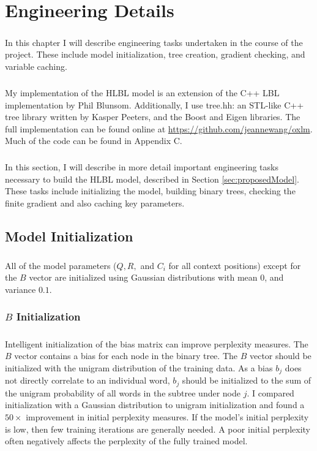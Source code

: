
\chapter{Engineering Details}
\paragraph{}
In this chapter I will describe engineering tasks undertaken in the course of the project. These include model initialization, tree creation, gradient checking, and variable caching.

\paragraph{}
My implementation of the HLBL model is an extension of the C++ LBL implementation by Phil Blunsom. Additionally, I use tree.hh: an STL-like C++ tree library written by Kasper Peeters, and the Boost \cite{BoostSite} and Eigen \cite{eigenweb} libraries. The full implementation can be found online at \url{https://github.com/jeannewang/oxlm}. Much of the code can be found in Appendix C.
\paragraph{}
In this section, I will describe in more detail important engineering tasks necessary to build the HLBL model, described in Section \ref{sec:proposedModel}. These tasks include initializing the model, building binary trees, checking the finite gradient and also caching key parameters.

\section{Model Initialization}
\paragraph{}
All of the model parameters ($Q,R,$ and $C_i$ for all context positions) except for the $B$ vector are initialized using Gaussian distributions with mean $0$, and variance $0.1$.
\subsection{$B$ Initialization}
\paragraph{}
Intelligent initialization of the bias matrix can improve perplexity measures. The $B$ vector contains a bias for each node in the binary tree.  The $B$ vector should be initialized with the unigram distribution of the training data. As a bias $b_j$ does not directly correlate to an individual word, $b_j$ should be initialized to the sum of the unigram probability of all words in the subtree under node $j$.  I compared initialization with a Gaussian distribution to unigram initialization and found a $50\times$ improvement in initial perplexity measures. If the model's initial perplexity is low, then few training iterations are generally needed. A poor initial perplexity often negatively affects the perplexity of the fully trained model.

